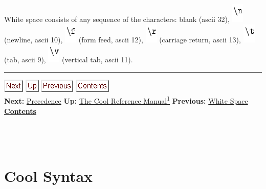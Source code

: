 \documentclass[]{article}
\begin{document}
White space consists of any sequence of the characters: blank (ascii
32), \includegraphics{img38.png} (newline, ascii 10),
\includegraphics{img39.png} (form feed, ascii 12),
\includegraphics{img40.png} (carriage return, ascii 13),
\includegraphics{img41.png} (tab, ascii 9), \includegraphics{img42.png}
(vertical tab, ascii 11). \\

\begin{center}\rule{3in}{0.4pt}\end{center}

\href{node40.html}{\includegraphics{next.png}}
\href{cool-manual.html}{\includegraphics{up.png}}
\href{node38.html}{\includegraphics{prev.png}}
\href{node1.html}{\includegraphics{contents.png}} \\ \textbf{Next:}
\href{node40.html}{Precedence} \textbf{Up:} \href{cool-manual.html}{The
Cool Reference Manual\textsuperscript{1}} \textbf{Previous:}
\href{node38.html}{White Space} ~ \textbf{\href{node1.html}{Contents}}
\\ \\

\section{\\ Cool Syntax}
\end{document}
